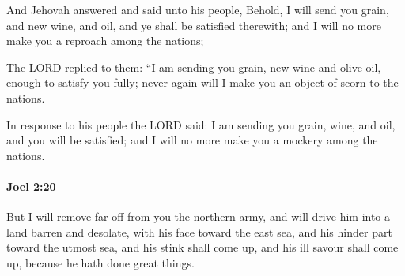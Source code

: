 			\begin{versebox}
					\item[BHS] 
					\item[LXX] 
					\item[ASV] And Jehovah answered and said unto his people, Behold, I will send you grain, and new wine, and oil, and ye shall be satisfied therewith; and I will no more make you a reproach among the nations;
					\item[NIV] The LORD replied to them: “I am sending you grain, new wine and olive oil, enough to satisfy you fully; never again will I make you an object of scorn to the nations.
					\item[NRSV] In response to his people the LORD said: I am sending you grain, wine, and oil, and you will be satisfied; and I will no more make you a mockery among the nations.
			\end{versebox}

		\paragraph{Joel 2:20} %
			\label{JOEL-2-20}

			But I will remove far off from you the northern army, and will drive him into a land barren and desolate, with his face toward the east sea, and his hinder part toward the utmost sea, and his stink shall come up, and his ill savour shall come up, because he hath done great things.

